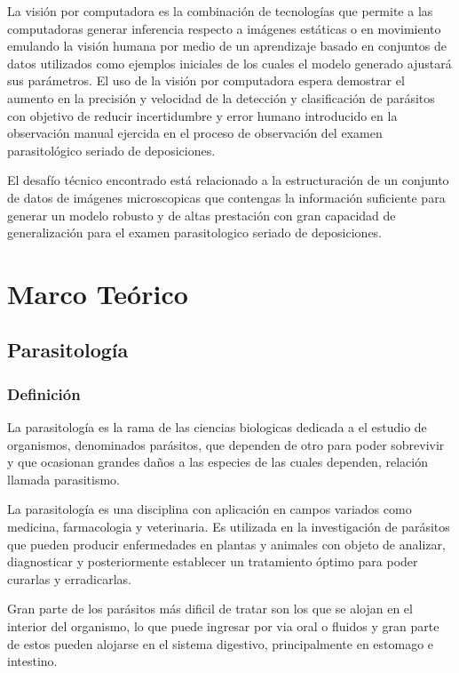 \documentclass[letter,12pt]{report}
\begin{document}
    La visión por computadora es la combinación de tecnologías que permite a las
    computadoras generar inferencia respecto a imágenes estáticas o en movimiento
    emulando la visión humana por medio de un aprendizaje basado en conjuntos de datos
    utilizados como ejemplos iniciales de los cuales el modelo generado ajustará sus
    parámetros. %
    El uso de la visión por computadora espera demostrar el aumento en la precisión y
    velocidad de la detección y clasificación de parásitos con objetivo de reducir
    incertidumbre y error humano introducido en la observación manual ejercida en el proceso
    de observación del examen parasitológico seriado de deposiciones. 

    El desafío técnico encontrado está relacionado a la estructuración de un conjunto de
    datos de imágenes microscopicas que contengas la información suficiente para generar
    un modelo robusto y de altas prestación con gran capacidad de generalización para el
    examen parasitologico seriado de deposiciones.


\chapter{Marco Teórico}\label{teorico}

\section{Parasitología}
\subsection{Definición}
La parasitología \cite{c02} es la rama de las ciencias biologicas dedicada a el estudio de
organismos, denominados parásitos, que dependen de otro para poder sobrevivir y que
ocasionan grandes daños a las especies de las cuales dependen, relación llamada
parasitismo.

La parasitología es una disciplina con aplicación en campos variados como medicina,
farmacologia y veterinaria. Es utilizada en la investigación de parásitos que pueden
producir enfermedades en plantas y animales con objeto de analizar, diagnosticar y
posteriormente establecer un tratamiento óptimo para poder curarlas y erradicarlas.

Gran parte de los parásitos más dificil de tratar son los que se alojan en el
interior del organismo, lo que puede ingresar por via oral o fluidos y gran parte de
estos pueden alojarse en el sistema digestivo, principalmente en estomago e
intestino.
\end{document}
